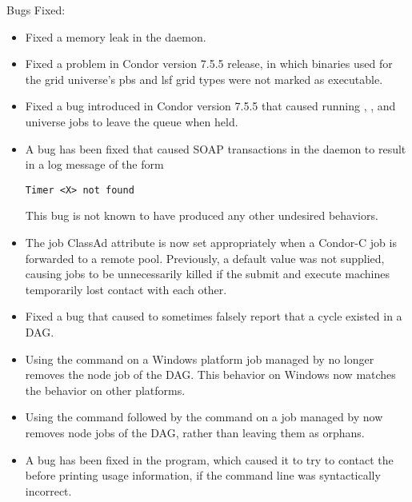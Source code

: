\noindent Bugs Fixed:

\begin{itemize}

\item Fixed a memory leak in the  daemon.

\item Fixed a problem in Condor version 7.5.5 release,
  in which binaries used for the grid universe's pbs and lsf grid types 
  were not marked as executable.

\item Fixed a bug introduced in Condor version 7.5.5
that caused running , ,
and  universe jobs to leave the queue when held.

\item A bug has been fixed that caused SOAP transactions in the
   daemon to result in a log message of the form 
\begin{verbatim}
Timer <X> not found
\end{verbatim}
  This bug is not known to have produced any other undesired behaviors.

\item The job ClassAd attribute  is now set 
appropriately when a Condor-C job is forwarded to a remote pool.
Previously, a default value was not supplied,
causing jobs to be unnecessarily killed if the
submit and execute machines temporarily lost contact with each other.

\item Fixed a bug that caused  to sometimes falsely
report that a cycle existed in a DAG.

\item Using the  command on a Windows platform job managed
by  no longer removes the node job of the DAG.
This behavior on Windows now matches the behavior on other platforms.

\item Using the  command followed by the  
command on a job managed by 
now removes node jobs of the DAG, rather than leaving them as orphans.

\item A bug has been fixed in the  program,
  which caused it to try to contact the  before printing
  usage information, if the command line was syntactically incorrect.


\end{itemize}
